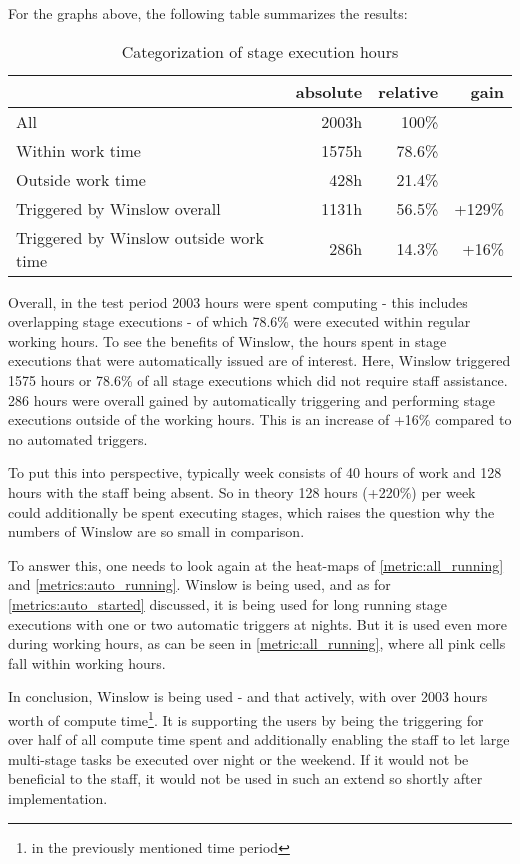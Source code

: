 For the graphs above, the following table summarizes the results:

\begin{table}[H]
	\centering
	\begin{tabular}{|l|r|r|r|}\hline
												& absolute 			& relative	& gain \\
		\hline
		All 		 							& 2003h 			& 100\% 	& \\
		Within work time						& 1575h				& 78.6\% 	& \\
		Outside work time	 					&  428h 			& 21.4\% 	& \\
		Triggered by Winslow overall			& 1131h				& 56.5\%	& +129\%\\
		Triggered by Winslow outside work time	&  286h  			& 14.3\% 	& +16\%\\
\hline
	\end{tabular}
	\caption{Categorization of stage execution hours}
\end{table}

Overall, in the test period 2003 hours were spent computing - this includes overlapping stage executions - of which 78.6\% were executed within regular working hours.
To see the benefits of Winslow, the hours spent in stage executions that were automatically issued are of interest.
Here, Winslow triggered 1575 hours or 78.6\% of all stage executions which did not require staff assistance.
286 hours were overall gained by automatically triggering and performing stage executions outside of the working hours.
This is an increase of +16\% compared to no automated triggers.

To put this into perspective, typically week consists of 40 hours of work and 128 hours with the staff being absent.
So in theory 128 hours (+220\%) per week could additionally be spent executing stages, which raises the question why the numbers of Winslow are so small in comparison.

To answer this, one needs to look again at the heat-maps of \autoref{metric:all_running} and \autoref{metrics:auto_running}.
Winslow is being used, and as for \autoref{metrics:auto_started} discussed, it is being used for long running stage executions with one or two automatic triggers at nights.
But it is used even more during working hours, as can be seen in \autoref{metric:all_running}, where all pink cells fall within working hours.

In conclusion, Winslow is being used - and that actively, with over 2003 hours worth of compute time\footnote{in the previously mentioned time period}.
It is supporting the users by being the triggering for over half of all compute time spent and additionally enabling the staff to let large multi-stage tasks be executed over night or the weekend.
If it would not be beneficial to the staff, it would not be used in such an extend so shortly after implementation.

